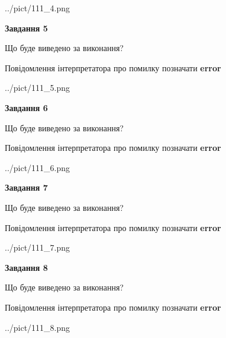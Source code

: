 \documentclass[12pt, ukrainian]{article}
\begin{document}
{\begin{center}
	{../pict/111_4.png}
\end{center}
\newpage

{\begin {center}\textbf{Завдання 5}\end {center}}\par
Що буде виведено за виконання? \par
Повідомлення інтерпретатора про помилку позначати \textbf{error}

\begin{center}
	{../pict/111_5.png}
\end{center}
\newpage

{\begin {center}\textbf{Завдання 6}\end {center}}\par
Що буде виведено за виконання? \par
Повідомлення інтерпретатора про помилку позначати \textbf{error}

\begin{center}
	{../pict/111_6.png}
\end{center}
\newpage

{\begin {center}\textbf{Завдання 7}\end {center}}\par
Що буде виведено за виконання? \par
Повідомлення інтерпретатора про помилку позначати \textbf{error}

\begin{center}
	{../pict/111_7.png}
\end{center}
\newpage

{\begin {center}\textbf{Завдання 8}\end {center}}\par
Що буде виведено за виконання? \par
Повідомлення інтерпретатора про помилку позначати \textbf{error}

\begin{center}
	{../pict/111_8.png}
\end{center}
\newpage

}
\end{document}
